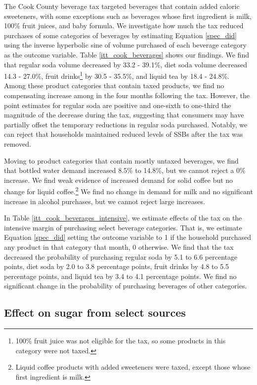 \documentclass[12pt]{article}
\begin{document}
The Cook County beverage tax targeted beverages that contain added caloric sweeteners, with some exceptions such as beverages whose first ingredient is milk, 100\% fruit juices, and baby formula. We investigate how much the tax reduced purchases of some categories of beverages by estimating Equation \ref{spec_did} using the inverse hyperbolic sine of volume purchased of each beverage category as the outcome variable. Table \ref{itt_cook_beverages} shows our findings. We find that regular soda volume decreased by 33.2 - 39.1\%, diet soda volume decreased 14.3 - 27.0\%, fruit drinks\footnote{100\% fruit juice was not eligible for the tax, so some products in this category were not taxed.} by 30.5 - 35.5\%, and liquid tea by 18.4 - 24.8\%. Among these product categories that contain taxed products, we find no compensating increase among in the four months following the tax. However, the point estimates for regular soda are positive and one-sixth to one-third the magnitude of the decrease during the tax, suggesting that consumers may have partially offset the temporary reductions in regular soda purchased. Notably, we can reject that households maintained reduced levels of SSBs after the tax was removed.

Moving to product categories that contain mostly untaxed beverages, we find that bottled water demand increased 8.5\% to 14.8\%, but we cannot reject a 0\% increase. We find weak evidence of increased demand for solid coffee but no change for liquid coffee.\footnote{Liquid coffee products with added sweeteners were taxed, except those whose first ingredient is milk.} We find no change in demand for milk and no significant increase in alcohol purchases, but we cannot reject large increases.

In Table \ref{itt_cook_beverages_intensive}, we estimate effects of the tax on the intensive margin of purchasing select beverage categories. That is, we estimate Equation \ref{spec_did} setting the outcome variable to 1 if the household purchased any product in that category that month, 0 otherwise. We find that the tax decreased the probability of purchasing regular soda by 5.1 to 6.6 percentage points, diet soda by 2.0 to 3.8 percentage points, fruit drinks by 4.8 to 5.5 percentage points, and liquid tea by 3.4 to 4.1 percentage points. We find no significant change in the probability of purchasing beverages of other categories.

\subsection{Effect on sugar from select sources}
\end{document}
